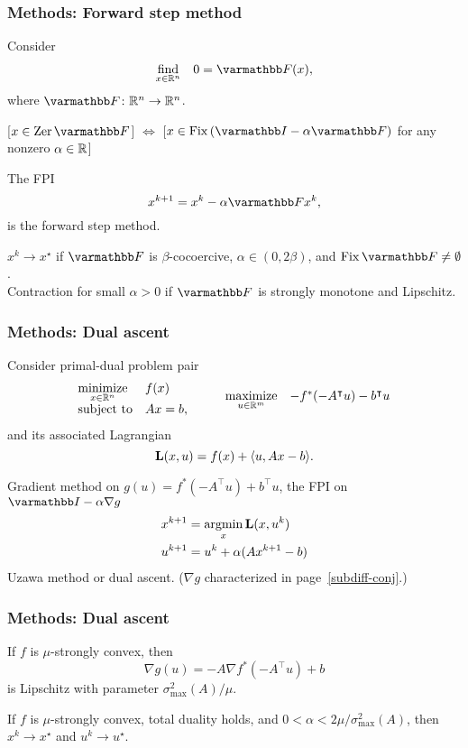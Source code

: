 \documentclass[10pt,mathserif]{beamer}
\begin{document}
\begin{frame}
\frametitle{Methods: Forward step method}
Consider
\[
\begin{array}{ll}
\underset{x\in \reals^n}{\mbox{find}}&0= \opF (x),
\end{array}
\]
where $\opF \colon\reals^n\rightarrow \reals^n$.
\vspace{0.2in}

[$x\in \zer \opF$] $\Leftrightarrow$ [$x\in \fix(\opI-\alpha \opF)$ for any nonzero $\alpha\in \mathbb{R}$]

\vspace{0.2in}


The FPI
\[
x^{k+1}=x^k-\alpha \opF x^k,
\]
is the forward step method.
\vspace{0.2in}


$x^k\rightarrow x^\star$ if $\opF $ is $\beta$-cocoercive, $\alpha\in (0,2\beta)$, and $\fix \opF\ne \emptyset$.\\
Contraction for small $\alpha>0$ if $\opF $ is strongly monotone and Lipschitz.
\end{frame}


\begin{frame}
\frametitle{Methods: Dual ascent}
Consider primal-dual problem pair
\[
\begin{array}{ll}
\underset{x\in \mathbb{R}^n}{\mbox{minimize}} &f(x)\\
\mbox{subject to} &Ax=b,
\end{array}
\qquad
\begin{array}{ll}
\underset{u\in\mathbb{R}^m}{\mbox{maximize}}&- f^*(-A^\intercal u)-b^\intercal u
\end{array}
\]
and its associated Lagrangian
\[
\mathbf{L}(x,u)=f(x)+\langle u,Ax-b\rangle.
\]
\vspace{0.2in}

Gradient method on $g(u)=f^*(-A^\intercal u)+b^\intercal u$, the FPI on $\opI-\alpha\nabla g$
\begin{align*}
x^{k+1}&=\operatorname*{argmin}_x \mathbf{L}(x,u^k)\nonumber\\
u^{k+1}&=u^k+\alpha (Ax^{k+1}-b)
\end{align*}
Uzawa method or dual ascent.
($\nabla g$ characterized in page~\ref{subdiff-conj}.)

\end{frame}

\begin{frame}
\frametitle{Methods: Dual ascent}

If $f$ is $\mu$-strongly convex, then
\[
\nabla g(u)=-A\nabla f^*(-A^\intercal u)+b
\]
is Lipschitz with parameter $\sigma_\mathrm{max}^2(A)/\mu$.
\vspace{0.2in}

If $f$ is $\mu$-strongly convex, total duality holds, and $0<\alpha<2\mu/\sigma^2_\mathrm{max}(A)$,
then $x^k\rightarrow x^\star$ and $u^k\rightarrow u^\star$.
\end{frame}
\end{document}
